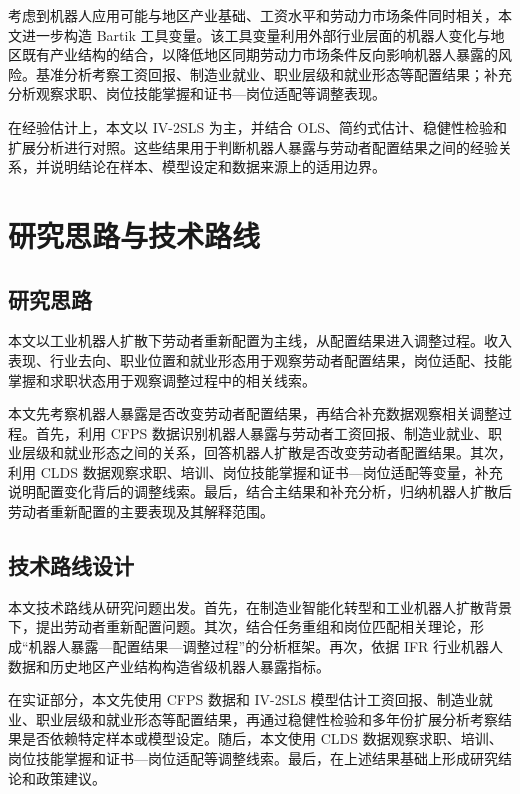 \documentclass[UTF8, zihao=-4, a4paper, openany, fontset=none]{ctexrep}
\numberwithin{equation}{chapter}
\begin{document}
考虑到机器人应用可能与地区产业基础、工资水平和劳动力市场条件同时相关，本文进一步构造 Bartik 工具变量。该工具变量利用外部行业层面的机器人变化与地区既有产业结构的结合，以降低地区同期劳动力市场条件反向影响机器人暴露的风险。基准分析考察工资回报、制造业就业、职业层级和就业形态等配置结果；补充分析观察求职、岗位技能掌握和证书---岗位适配等调整表现。

在经验估计上，本文以 IV-2SLS 为主，并结合 OLS、简约式估计、稳健性检验和扩展分析进行对照。这些结果用于判断机器人暴露与劳动者配置结果之间的经验关系，并说明结论在样本、模型设定和数据来源上的适用边界。

\section{研究思路与技术路线}\label{ux7814ux7a76ux601dux8defux4e0eux6280ux672fux8defux7ebf}

\subsection{研究思路}\label{ux7814ux7a76ux601dux8def}

本文以工业机器人扩散下劳动者重新配置为主线，从配置结果进入调整过程。收入表现、行业去向、职业位置和就业形态用于观察劳动者配置结果，岗位适配、技能掌握和求职状态用于观察调整过程中的相关线索。

本文先考察机器人暴露是否改变劳动者配置结果，再结合补充数据观察相关调整过程。首先，利用 CFPS 数据识别机器人暴露与劳动者工资回报、制造业就业、职业层级和就业形态之间的关系，回答机器人扩散是否改变劳动者配置结果。其次，利用 CLDS 数据观察求职、培训、岗位技能掌握和证书---岗位适配等变量，补充说明配置变化背后的调整线索。最后，结合主结果和补充分析，归纳机器人扩散后劳动者重新配置的主要表现及其解释范围。

\subsection{技术路线设计}\label{ux6280ux672fux8defux7ebfux8bbeux8ba1}

本文技术路线从研究问题出发。首先，在制造业智能化转型和工业机器人扩散背景下，提出劳动者重新配置问题。其次，结合任务重组和岗位匹配相关理论，形成``机器人暴露---配置结果---调整过程''的分析框架。再次，依据 IFR 行业机器人数据和历史地区产业结构构造省级机器人暴露指标。

在实证部分，本文先使用 CFPS 数据和 IV-2SLS 模型估计工资回报、制造业就业、职业层级和就业形态等配置结果，再通过稳健性检验和多年份扩展分析考察结果是否依赖特定样本或模型设定。随后，本文使用 CLDS 数据观察求职、培训、岗位技能掌握和证书---岗位适配等调整线索。最后，在上述结果基础上形成研究结论和政策建议。
\end{document}
